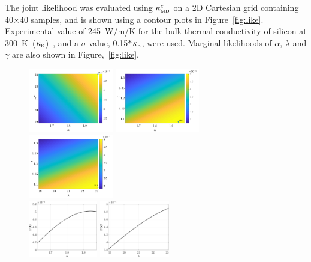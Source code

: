 The joint likelihood was evaluated using $\kappa_\text{\tiny{MD}}^{c}$ on a 2D Cartesian grid containing
40$\times$40 samples, and is shown
using a contour plots in Figure~\ref{fig:like}. Experimental value of 245~W/m/K for the
bulk thermal conductivity of silicon at 300~K~($\kappa_{\tiny{\mbox{E}}}$)~\cite{Volz:1999},
and a $\sigma$ value, 0.15$\ast$$\kappa_{\tiny{\mbox{E}}}$, were used.
Marginal likelihoods of  $\alpha$, $\lambda$ and $\gamma$ are also
shown in Figure,~\ref{fig:like}. 
%
\begin{figure}[htbp]
 \begin{center}
  \includegraphics[width=0.33\textwidth]{./Figures/gl_al}
  \includegraphics[width=0.33\textwidth]{./Figures/gl_ag}
  \includegraphics[width=0.33\textwidth]{./Figures/gl_lg}
  \\
  \includegraphics[width=0.27\textwidth]{./Figures/pdf_alpha}
  \includegraphics[width=0.27\textwidth]{./Figures/pdf_lambda}

\end{center}
\end{figure}$$
